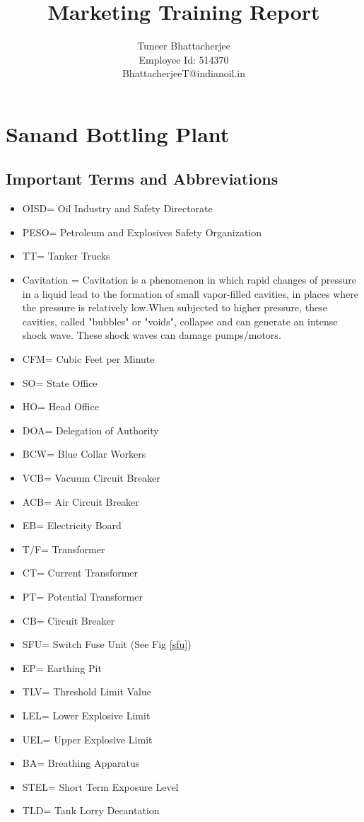 \documentclass{report}
\title{Marketing Training Report}
\author{Tuneer Bhattacherjee\\Employee Id: 514370\\BhattacherjeeT@indianoil.in}
\begin{document}
	\maketitle
	\pagebreak
	\tableofcontents
	\pagebreak
	\chapter{Sanand Bottling Plant}
	\section{Important Terms and Abbreviations}
	\begin{itemize}
		\item OISD= Oil Industry and Safety Directorate
		\item PESO= Petroleum and Explosives Safety Organization
		\item TT= Tanker Trucks
		\item Cavitation = Cavitation is a phenomenon in which rapid changes of pressure in a liquid lead to the formation of small vapor-filled cavities, in places where the pressure is relatively low.When subjected to higher pressure, these cavities, called "bubbles" or "voids", collapse and can generate an intense shock wave. These shock waves can damage pumps/motors.
		\item CFM= Cubic Feet per Minute
		\item SO= State Office
		\item HO= Head Office
		\item DOA= Delegation of Authority
		\item BCW= Blue Collar Workers
		\item VCB= Vacuum Circuit Breaker
		\item ACB= Air Circuit Breaker
		\item EB= Electricity Board
		\item T/F= Transformer
		\item CT= Current Transformer
		\item PT= Potential Transformer
		\item CB= Circuit Breaker
		\item SFU= Switch Fuse Unit (See Fig \ref{sfu})
		\item EP= Earthing Pit
		\item TLV= Threshold Limit Value
		\item LEL= Lower Explosive Limit
		\item UEL= Upper Explosive Limit
		\item BA= Breathing Apparatus
		\item STEL= Short Term Exposure Level
		\item TLD= Tank Lorry Decantation
	\end{itemize}
\end{document}
